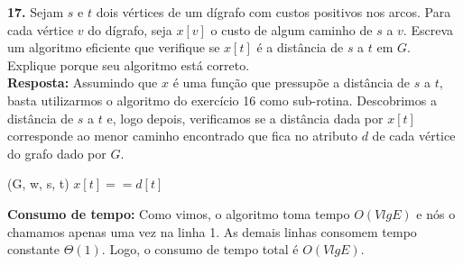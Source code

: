 
\noindent\textbf{17.} Sejam $s$ e $t$ dois vértices de um dígrafo com custos positivos nos arcos. Para cada vértice $v$ do dígrafo, seja $x[v]$ o custo de algum caminho de $s$ a $v$. Escreva um algoritmo eficiente que verifique se $x[t]$ é a distância de $s$ a $t$ em $G$. Explique porque seu algoritmo está correto.\\[6pt]
\textbf{Resposta:} Assumindo que $x$ é uma função que pressupõe a distância de $s$ a $t$, basta utilizarmos o algoritmo  do exercício 16 como sub-rotina. Descobrimos a distância de $s$ a $t$ e, logo depois, verificamos se a distância dada por $x[t]$ corresponde ao menor caminho encontrado que fica no atributo $d$ de cada vértice do grafo dado por $G$.

\begin{codebox}
\li {}(G, w, s, t)
\li \If $x[t] == d[t]$
\li	\Then
		\Return {}
\li \Else
\li     \Return {}
\end{codebox}

\textbf{Consumo de tempo:} Como vimos, o algoritmo  toma tempo $O(V lg E)$ e nós o chamamos apenas uma vez na linha 1. As demais linhas consomem tempo constante $\Theta(1)$. Logo, o consumo de tempo total é $O(V lg E)$.\\[6pt]